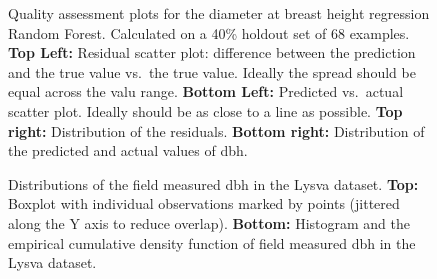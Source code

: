 \begin{figure}
\caption[Quality assessment plots for the dbh regression Random Forest.]{\label{fig-reg-residuals}Quality assessment plots for the
diameter at breast height regression Random Forest. Calculated on a 40\%
holdout set of 68 examples. \textbf{Top Left:} Residual scatter plot:
difference between the prediction and the true value vs.~the true value.
Ideally the spread should be equal across the valu range. \textbf{Bottom
Left:} Predicted vs.~actual scatter plot. Ideally should be as close to
a line as possible. \textbf{Top right:} Distribution of the residuals.
\textbf{Bottom right:} Distribution of the predicted and actual values
of dbh.}
\end{figure}

\begin{figure}
\caption[Distribution of field mesured dbh in the Lysva dataset.]{\label{fig-dbh-distribution}
    Distributions of the field measured dbh in the Lysva dataset.
    \textbf{Top:} Boxplot with individual observations marked by points (jittered along the Y axis to reduce overlap).
    \textbf{Bottom:} Histogram and the empirical cumulative density function of field measured dbh in the Lysva dataset.
}
\end{figure}

